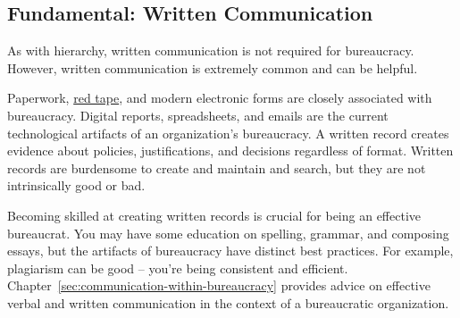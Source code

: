 \subsection*{Fundamental: Written Communication\label{sec:written-communication}}

As with hierarchy, written communication is not required for bureaucracy. However, written communication is extremely common and can be helpful. %

Paperwork,  \href{https://en.wikipedia.org/wiki/Red_tape}{red tape},
and modern electronic forms are closely associated with bureaucracy.
Digital reports, spreadsheets, and emails are the current technological artifacts of an organization's bureaucracy. A written record creates evidence about policies, justifications, and decisions regardless of format. %
Written records are burdensome to create and maintain and search, but they are not intrinsically good or bad. 

Becoming skilled at creating written records is crucial for being an effective bureaucrat. You may have some education on spelling, grammar, and composing essays, but the artifacts of bureaucracy have distinct best practices. For example, plagiarism can be good -- you're being consistent and efficient.  
Chapter~\ref{sec:communication-within-bureaucracy} 
%
provides advice on effective verbal and written communication in the context of a bureaucratic organization. 